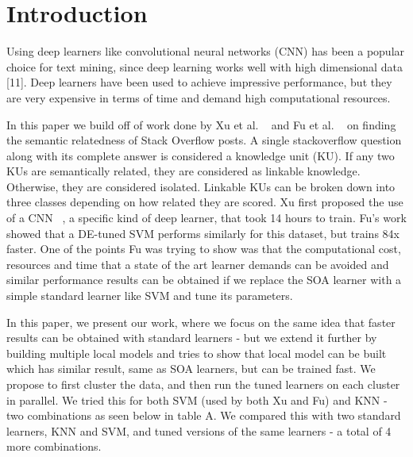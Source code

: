 \documentclass[sigconf]{acmart}
\theoremstyle{break}
\begin{document}




\maketitle

\section{Introduction}
    \label{sect:intro}
    Using deep learners like convolutional neural networks (CNN) has been a popular choice for text mining, since deep learning works well with high dimensional data [11]. Deep learners have been used to achieve impressive performance, but they are very expensive in terms of time and demand high computational resources.
    
    In this paper we build off of work done by Xu et al. ~\cite{xu2016predicting} and Fu et al. ~\cite{fu2017easy} on finding the semantic relatedness of Stack Overflow posts. A single stackoverflow question along with its complete answer is considered a knowledge unit (KU). If any two KUs are semantically related, they are considered as linkable knowledge. Otherwise, they are considered isolated. Linkable KUs can be broken down into three classes depending on how related they are scored. Xu first proposed the use of a CNN ~\cite{hubel1959receptive}, a specific kind of deep learner, that took 14 hours to train. Fu's work showed that a DE-tuned SVM performs similarly for this dataset, but trains 84x faster. One of the points Fu was trying to show was that the computational cost, resources and time that a state of the art learner demands can be avoided and similar performance results can be obtained if we replace the SOA learner with a simple standard learner like SVM and tune its parameters. 
    
    In this paper, we present our work, where we focus on the same idea that faster results can be obtained with standard learners - but we extend it further by building multiple local models and tries to show that local model can be built which has similar result, same as SOA learners, but can be trained fast. We propose to first cluster the data, and then run the tuned learners on each cluster in parallel. We tried this for both SVM (used by both Xu and Fu) and KNN - two combinations as seen below in table A. We compared this with two standard learners, KNN and SVM, and tuned versions of the same learners - a total of 4 more combinations. 
    
\end{document}
